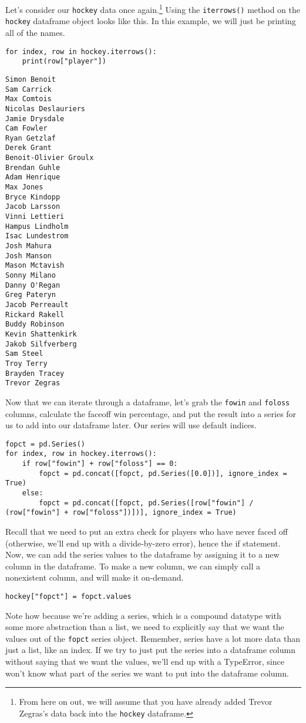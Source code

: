 Let's consider our \verb|hockey| data once again.\cprotect\footnote{From here on out, we will assume that you have already added Trevor Zegras's data back into the \verb|hockey| dataframe.} Using the \verb|iterrows()| method on the \verb|hockey| dataframe object looks like this. In this example, we will just be printing all of the names.\par
\begin{lstlisting}[style=pippython]
for index, row in hockey.iterrows():
	print(row["player"])
\end{lstlisting}
\begin{lstlisting}[style=none]
Simon Benoit
Sam Carrick
Max Comtois
Nicolas Deslauriers
Jamie Drysdale
Cam Fowler
Ryan Getzlaf
Derek Grant
Benoit-Olivier Groulx
Brendan Guhle
Adam Henrique
Max Jones
Bryce Kindopp
Jacob Larsson
Vinni Lettieri
Hampus Lindholm
Isac Lundestrom
Josh Mahura
Josh Manson
Mason Mctavish
Sonny Milano
Danny O'Regan
Greg Pateryn
Jacob Perreault
Rickard Rakell
Buddy Robinson
Kevin Shattenkirk
Jakob Silfverberg
Sam Steel
Troy Terry
Brayden Tracey
Trevor Zegras
\end{lstlisting}
Now that we can iterate through a dataframe, let's grab the \verb|fowin| and \verb|foloss| columns, calculate the faceoff win percentage, and put the result into a  series for us to add into our dataframe later. Our series will use default indices.\par
\begin{lstlisting}[style=pippython]
fopct = pd.Series()
for index, row in hockey.iterrows():
	if row["fowin"] + row["foloss"] == 0:
		fopct = pd.concat([fopct, pd.Series([0.0])], ignore_index = True)
	else:
		fopct = pd.concat([fopct, pd.Series([row["fowin"] / (row["fowin"] + row["foloss"])])], ignore_index = True)
\end{lstlisting}
Recall that we need to put an extra check for players who have never faced off (otherwise, we'll end up with a divide-by-zero error), hence the if statement. Now, we can add the series values to the dataframe by assigning it to a new column in the dataframe. To make a new column, we can simply call a nonexistent column, and  will make it on-demand.\par
\begin{lstlisting}[style=pippython]
hockey["fopct"] = fopct.values
\end{lstlisting}
Note how because we're adding a series, which is a compound datatype with some more abstraction than a list, we need to explicitly say that we want the values out of the \verb|fopct| series object. Remember, series have a lot more data than just a list, like an index. If we try to just put the series into a dataframe column without saying that we want the values, we'll end up with a TypeError, since  won't know what part of the series we want to put into the dataframe column.
